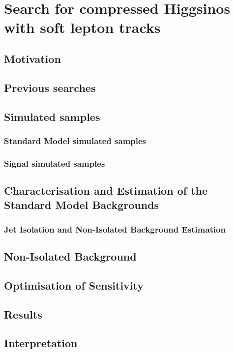 \chapter{Search for compressed Higgsinos  with soft
lepton tracks}

\section{Motivation}

\section{Previous searches}




\section{Simulated samples}
\subsection{Standard Model simulated samples}
\label{sec:sm-mc}
\subsection{Signal simulated samples}
\label{signal-simulation}







\clearpage
\section{Characterisation and Estimation of the Standard Model Backgrounds}

\subsection{Jet Isolation and Non-Isolated Background Estimation}
\label{jetty-background-estimation}

\section{Non-Isolated Background}

\section{Optimisation of Sensitivity}

\section{Results}

\section{Interpretation}
